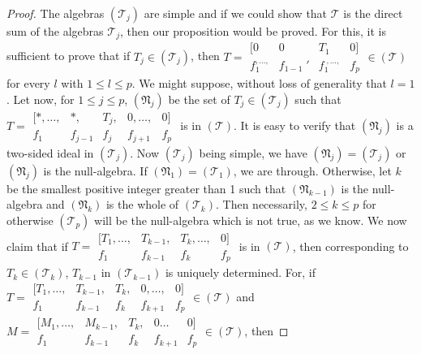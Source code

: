 \begin{proof}
The algebras $(\mathscr{T}_j)$ are simple and if we could show that
$\mathscr{T}$ is the direct sum of the algebras $\mathscr{T}_j$, then
our proposition would be proved. For this, it is sufficient to prove
that if $T_j \in (\mathscr{T}_j)$, then $T =
\begin{smallmatrix} \big[0 & 0 & T_1 & 0 \big]\\ f_1^{,\dots,} &
  f_{1-1}{\; '}& 
  f_1^{\; ,\dots,} &  f_p \end{smallmatrix} \in 
(\mathscr{T})$ for every $l$ with $1\leq l \leq p$. We might suppose,
without loss of generality that $l=1$. Let now, for $1\leq j \leq p$,
$(\mathfrak{N}_j)$ be the set of $T_j\in (\mathscr{T}_j)$ such that
$T= \begin{smallmatrix} \big[\ast, \ldots, &  \ast, & T_j, & 
 0,\ldots, & 0 \big]\\f_1 & f_{j-1} & f_j & f_{j+1} &
  f_p  \end{smallmatrix}$ is in $(\mathscr{T})$. It is easy to 
verify that $(\mathfrak{N}_j)$ is a two-sided ideal in
$(\mathscr{T}_j)$. Now $(\mathscr{T}_j)$ being simple, we have
$(\mathfrak{N}_j) = (\mathscr{T}_j)$ or $(\mathfrak{N}_j)$ is the
null-algebra. If $(\mathfrak{N}_1) = (\mathscr{T}_1)$, we are
through. Otherwise, let $k$ be the smallest positive integer greater
than 1 such that $(\mathfrak{N}_{k-1})$ is the null-algebra and
$(\mathfrak{N}_k)$ is the whole of $(\mathscr{T}_k)$. Then
necessarily, $2\leq k \leq p$ for otherwise $(\mathscr{T}_p)$ will be
the null-algebra which is not true, as we know. We now claim that if
$T= \begin{smallmatrix} \big[T_1,\ldots, & T_{k-1}, &
  T_k,\ldots, & 0 \big]\\ f_1 & f_{k-1} & f_k &
  f_p \end{smallmatrix}$ is in $(\mathscr{T})$, then
corresponding to $T_k\in (\mathscr{T}_k)$, $T_{k-1}$ in
$(\mathscr{T}_{k-1})$ is uniquely determined. For, if 
$T = \begin{smallmatrix}\big[T_1,\ldots, & T_{k-1}, & T_k, &
    0,\ldots, & 0 \big]\\ f_1 & f_{k-1} & f_k & f_{k+1} &
    f_p\end{smallmatrix} \in (\mathscr{T})$ and $M =
\begin{smallmatrix} \big[M_1,\ldots, & M_{k-1}, & 
  T_k, & 0\ldots & 0 \big]\\ f_1 & f_{k-1} & f_k & f_{k+1} &
  f_p \end{smallmatrix} \in (\mathscr{T})$, \pageoriginale then

\end{proof}
